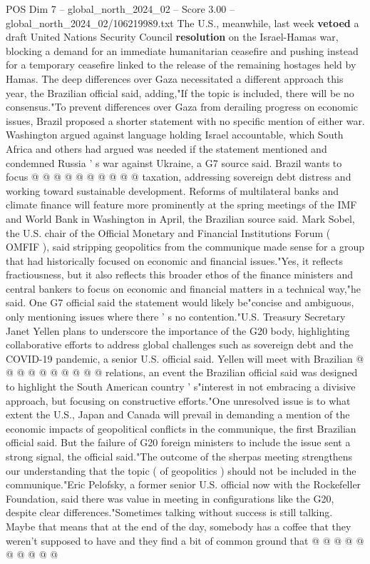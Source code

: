 \begin{textsample}{POS Dim 7 – global\_north\_2024\_02 – Score 3.00 – global\_north\_2024\_02/106219989.txt}
The U.S., meanwhile, last week \textbf{vetoed} a draft United Nations Security Council \textbf{resolution} on the Israel-Hamas war, blocking a demand for an immediate humanitarian ceasefire and pushing instead for a temporary ceasefire linked to the release of the remaining hostages held by Hamas.
The deep differences over Gaza necessitated a different approach this year, the Brazilian official said, adding,"If the topic is included, there will be no consensus."To prevent differences over Gaza from derailing progress on economic issues, Brazil proposed a shorter statement with no specific mention of either war.
Washington argued against language holding Israel accountable, which South Africa and others had argued was needed if the statement mentioned and condemned Russia ' s war against Ukraine, a G7 source said.
Brazil wants to focus @ @ @ @ @ @ @ @ @ @ taxation, addressing sovereign debt distress and working toward sustainable development.
Reforms of multilateral banks and climate finance will feature more prominently at the spring meetings of the IMF and World Bank in Washington in April, the Brazilian source said.
Mark Sobel, the U.S. chair of the Official Monetary and Financial Institutions Forum ( OMFIF ), said stripping geopolitics from the communique made sense for a group that had historically focused on economic and financial issues."Yes, it reflects fractiousness, but it also reflects this broader ethos of the finance ministers and central bankers to focus on economic and financial matters in a technical way,"he said.
One G7 official said the statement would likely be"concise and ambiguous, only mentioning issues where there ' s no contention."U.S.
Treasury Secretary Janet Yellen plans to underscore the importance of the G20 body, highlighting collaborative efforts to address global challenges such as sovereign debt and the COVID-19 pandemic, a senior U.S. official said.
Yellen will meet with Brazilian @ @ @ @ @ @ @ @ @ @ relations, an event the Brazilian official said was designed to highlight the South American country ' s"interest in not embracing a divisive approach, but focusing on constructive efforts."One unresolved issue is to what extent the U.S., Japan and Canada will prevail in demanding a mention of the economic impacts of geopolitical conflicts in the communique, the first Brazilian official said.
But the failure of G20 foreign ministers to include the issue sent a strong signal, the official said."The outcome of the sherpas meeting strengthens our understanding that the topic ( of geopolitics ) should not be included in the communique."Eric Pelofsky, a former senior U.S. official now with the Rockefeller Foundation, said there was value in meeting in configurations like the G20, despite clear differences."Sometimes talking without success is still talking.
Maybe that means that at the end of the day, somebody has a coffee that they weren't supposed to have and they find a bit of common ground that @ @ @ @ @ @ @ @ @ @

\end{textsample}

